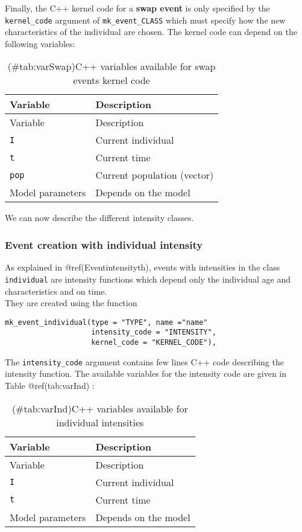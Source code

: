 Finally, the C++ kernel code for a \textbf{swap event} is only specified by the \texttt{kernel\_code} argument of \texttt{mk\_event\_CLASS} which must specify how the new characteristics of the individual are chosen. The kernel code can depend on the following variables:

\begin{longtable}[]{@{}ll@{}}
\caption{(\#tab:varSwap)C++ variables available for swap events kernel code}\tabularnewline
\toprule
Variable & Description\tabularnewline
\midrule
\endfirsthead
\toprule
Variable & Description\tabularnewline
\midrule
\endhead
\texttt{I} & Current individual\tabularnewline
\texttt{t} & Current time\tabularnewline
\texttt{pop} & Current population (vector)\tabularnewline
Model parameters & Depends on the model\tabularnewline
\bottomrule
\end{longtable}

We can now describe the different intensity classes.

\hypertarget{event-creation-with-individual-intensity}{%
\subsubsection{Event creation with individual intensity}\label{event-creation-with-individual-intensity}}

As explained in @ref(Eventintensityth), events with intensities in the class \texttt{individual} are intensity functions which depend only the individual age and characteristics and on time.\\
They are created using the function

\begin{verbatim}
mk_event_individual(type = "TYPE", name ="name" 
                    intensity_code = "INTENSITY",   
                    kernel_code = "KERNEL_CODE"),
\end{verbatim}

The \texttt{intensity\_code} argument contains few lines C++ code describing the intensity function. The available variables for the intensity code are given in Table @ref(tab:varInd) :

\begin{longtable}[]{@{}ll@{}}
\caption{(\#tab:varInd)C++ variables available for individual intensities}\tabularnewline
\toprule
Variable & Description\tabularnewline
\midrule
\endfirsthead
\toprule
Variable & Description\tabularnewline
\midrule
\endhead
\texttt{I} & Current individual\tabularnewline
\texttt{t} & Current time\tabularnewline
Model parameters & Depends on the model\tabularnewline
\bottomrule
\end{longtable}

